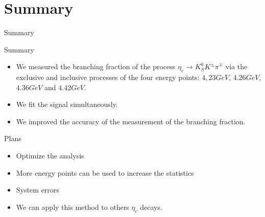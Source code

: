 \documentclass{beamer}
\begin{document}
    \section{Summary}
    \begin{frame}{Summary}
        \begin{block}{Summary}
            \begin{itemize}
                \item We measured the branching fraction of the process $\eta_c\to K_S^0 K^{\pm} \pi^{\mp}$ via the exclusive and inclusive processes of the four energy points: $4,23 GeV$, $4.26 GeV$, $4.36 GeV$ and $4.42 GeV$.
                \item We fit the signal simultaneously.
                \item We improved the accuracy of the measurement of the branching fraction.
            \end{itemize}
        \end{block}
        \begin{block}{Plans}
            \begin{itemize}
                \item Optimize the analysis
                \item More energy points can be used to increase the statistics
                \item System errors
                \item We can apply this method to others $\eta_c$ decays.
            \end{itemize}
        \end{block}
    \end{frame}
    
\end{document}
